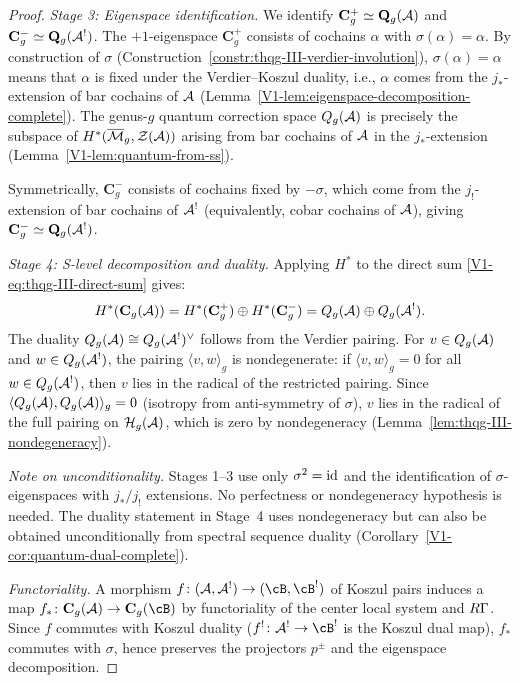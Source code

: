 \begin{proof}
\emph{Stage 3: Eigenspace identification.}
We identify $\mathbf{C}_g^+ \simeq \mathbf{Q}_g(\mathcal{A})$ and
$\mathbf{C}_g^- \simeq \mathbf{Q}_g(\mathcal{A}^!)$.
The $+1$-eigenspace $\mathbf{C}_g^+$ consists of cochains
$\alpha$ with $\sigma(\alpha) = \alpha$. By construction
of $\sigma$
(Construction~\ref{constr:thqg-III-verdier-involution}),
$\sigma(\alpha) = \alpha$ means that $\alpha$ is fixed under
the Verdier--Koszul duality, i.e., $\alpha$ comes from the
$j_*$-extension of bar cochains of $\mathcal{A}$
(Lemma~\ref{V1-lem:eigenspace-decomposition-complete}).
The genus-$g$ quantum correction space $Q_g(\mathcal{A})$ is precisely
the subspace of $H^*(\overline{\mathcal{M}}_g, \mathcal{Z}(\mathcal{A}))$
arising from bar cochains of $\mathcal{A}$ in the $j_*$-extension
(Lemma~\ref{V1-lem:quantum-from-ss}).

Symmetrically, $\mathbf{C}_g^-$ consists of cochains fixed by
$-\sigma$, which come from the $j_!$-extension of bar
cochains of $\mathcal{A}^!$ (equivalently, cobar cochains of $\mathcal{A}$),
giving $\mathbf{C}_g^- \simeq \mathbf{Q}_g(\mathcal{A}^!)$.

\emph{Stage 4: S-level decomposition and duality.}
Applying $H^*$ to the direct sum
\eqref{V1-eq:thqg-III-direct-sum} gives:
\[
H^*(\mathbf{C}_g(\mathcal{A}))
= H^*(\mathbf{C}_g^+) \oplus H^*(\mathbf{C}_g^-)
= Q_g(\mathcal{A}) \oplus Q_g(\mathcal{A}^!).
\]
The duality $Q_g(\mathcal{A}) \cong Q_g(\mathcal{A}^!)^{\vee}$ follows from
the Verdier pairing. For $v \in Q_g(\mathcal{A})$ and
$w \in Q_g(\mathcal{A}^!)$, the pairing $\langle v, w \rangle_g$
is nondegenerate: if $\langle v, w \rangle_g = 0$ for all
$w \in Q_g(\mathcal{A}^!)$, then $v$ lies in the radical of the
restricted pairing. Since
$\langle Q_g(\mathcal{A}), Q_g(\mathcal{A}) \rangle_g = 0$
(isotropy from anti-symmetry of $\sigma$),
$v$ lies in the radical of the full pairing on
$\mathcal{H}_g(\mathcal{A})$, which is zero by nondegeneracy
(Lemma~\ref{lem:thqg-III-nondegeneracy}).

\emph{Note on unconditionality.}
Stages 1--3 use only $\sigma^2 = \mathrm{id}$ and the
identification of $\sigma$-eigenspaces with $j_*/j_!$
extensions. No perfectness or nondegeneracy hypothesis is
needed. The duality statement in Stage~4 uses
nondegeneracy but can also be obtained unconditionally from
spectral sequence duality
(Corollary~\ref{V1-cor:quantum-dual-complete}).

\emph{Functoriality.}
A morphism $f \colon (\cA, \cA^!) \to (\cB, \cB^!)$
of Koszul pairs induces a map
$f_* \colon \mathbf{C}_g(\cA) \to \mathbf{C}_g(\cB)$
by functoriality of the center local system and $R\Gamma$.
Since $f$ commutes with Koszul duality
($f^! \colon \cA^! \to \cB^!$ is the Koszul dual map),
$f_*$ commutes with $\sigma$, hence preserves the
projectors $p^\pm$ and the eigenspace decomposition.
\end{proof}

